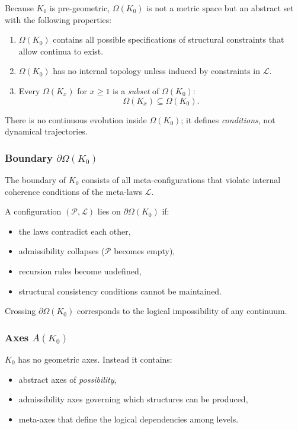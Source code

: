 Because $K_0$ is pre-geometric, $\Omega(K_0)$ is not a metric space but
an abstract set with the following properties:
\begin{enumerate}
    \item $\Omega(K_0)$ contains all possible specifications of
          structural constraints that allow continua to exist.
    \item $\Omega(K_0)$ has no internal topology unless induced by
          constraints in $\mathcal{L}$.
    \item Every $\Omega(K_x)$ for $x \ge 1$ is a \emph{subset} of
          $\Omega(K_0)$:
          \[
              \Omega(K_x) \subseteq \Omega(K_0).
          \]
\end{enumerate}

There is no continuous evolution inside $\Omega(K_0)$; it defines
\emph{conditions}, not dynamical trajectories.

\subsubsection{Boundary \texorpdfstring{$\partial\Omega(K_0)$}{\partial\Omega(K_0)}}

The boundary of $K_0$ consists of all meta-configurations that violate
internal coherence conditions of the meta-laws $\mathcal{L}$.

A configuration $(\mathcal{P},\mathcal{L})$ lies on $\partial\Omega(K_0)$ if:
\begin{itemize}
    \item the laws contradict each other,
    \item admissibility collapses ($\mathcal{P}$ becomes empty),
    \item recursion rules become undefined,
    \item structural consistency conditions cannot be maintained.
\end{itemize}

Crossing $\partial\Omega(K_0)$ corresponds to the logical impossibility
of any continuum.

\subsubsection{Axes \texorpdfstring{$A(K_0)$}{A(K_0)}}

$K_0$ has no geometric axes. Instead it contains:
\begin{itemize}
    \item abstract axes of \emph{possibility},
    \item admissibility axes governing which structures can be produced,
    \item meta-axes that define the logical dependencies among levels.
\end{itemize}

